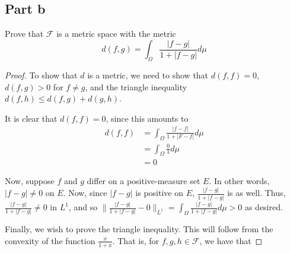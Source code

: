 \documentclass[fontsize=11pt]{scrartcl} %
\numberwithin{equation}{section} %
\numberwithin{figure}{section} %
\numberwithin{table}{section} %
\begin{document}
\subsection*{Part b}
Prove that $\mathscr{F}$ is a metric space with the metric
\[
    d(f,g) = \int_{\Omega}\frac{|f-g|}{1+|f-g|}d\mu
\]
\begin{proof}
    To show that $d$ is a metric, we need to show that $d(f,f)=0$, $d(f,g)>0$
    for $f\neq g$, and the triangle inequality $d(f,h)\leq d(f,g)+d(g,h)$.

    It is clear that $d(f,f)=0$, since this amounts to
    \[
        \begin{aligned}
            d(f,f) &= \int_{\Omega}\frac{|f-f|}{1+|F-f|}d\mu\\
                    &=\int_{\Omega}\frac{0}{1}d\mu\\
                    &=0
        \end{aligned}
    \]

    Now, suppose $f$ and $g$ differ on a positive-measure set $E$. In other
    words, $|f-g|\neq 0$ on $E$. Now, since $|f-g|$ is positive on $E$,
    $\frac{|f-g|}{1+|f-g|}$ is as well. Thus, $\frac{|f-g|}{1+|f-g|}\neq 0$ in
    $L^1$, and so $\|\frac{|f-g|}{1+|f-g|}-0\|_{L^1}
    =\int_{\Omega}\frac{|f-g|}{1+|f-g|}d\mu >0$ as desired.

    Finally, we wish to prove the triangle inequality. This will follow from the
    convexity of the function $\frac{x}{1+x}$. That is, for
    $f,g,h\in\mathscr{F}$, we have that
\end{proof}
\end{document}
